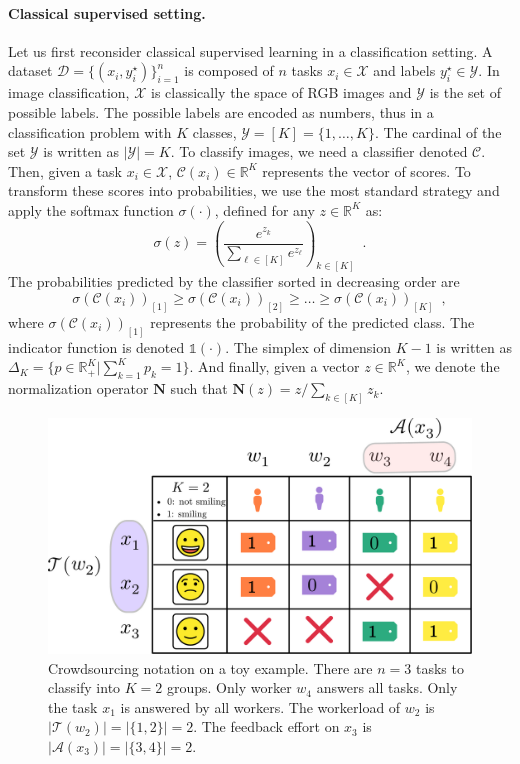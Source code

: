 \paragraph*{Classical supervised setting.}Let us first reconsider classical supervised learning in a classification setting.
A dataset $\mathcal{D}=\{(x_i, y_i^\star)\}_{i=1}^n$ is composed of $n$ tasks $x_i\in\mathcal{X}$ and labels $y_i^\star\in\mathcal{Y}$.
In image classification, $\mathcal{X}$ is classically the space of RGB images and $\mathcal{Y}$ is the set of possible labels.
The possible labels are encoded as numbers, thus in a classification problem with $K$ classes, $\mathcal{Y}=[K]=\{1,\dots,K\}$.
The cardinal of the set $\mathcal{Y}$ is written as $|\mathcal{Y}|=K$.
To classify images, we need a classifier denoted $\mathcal{C}$.
Then, given a task $x_i\in\mathcal{X}$, $\mathcal{C}(x_i)\in\mathbb{R}^K$ represents the vector of scores.
To transform these scores into probabilities, we use the most standard strategy and apply the softmax function $\sigma(\cdot)$, defined for any $z\in\mathbb{R}^K$ as:
$$
\sigma(z) = \left(\frac{e^{z_k}}{\sum_{\ell\in [K]} e^{z_\ell}}\right)_{k\in [K]} \enspace.
$$
The probabilities predicted by the classifier sorted in decreasing order are
$$
\sigma(\mathcal{C}(x_i))_{[1]} \geq \sigma(\mathcal{C}(x_i))_{[2]}\geq \dots\geq \sigma(\mathcal{C}(x_i))_{[K]} \enspace,
$$
where $\sigma(\mathcal{C}(x_i))_{[1]}$ represents the probability of the predicted class.
The indicator function is denoted $\mathds{1}(\cdot)$. The simplex of dimension $K-1$ is written as $\Delta_K=\{p \in\mathbb{R}^K_+ | \sum_{k=1}^K p_k = 1\}$.
And finally, given a vector $z\in\mathbb{R}^K$, we denote the normalization operator $\mathbf{N}$ such that $\mathbf{N}(z) = z / \sum_{k\in[K]}z_k$.

\begin{figure}[thb]
    \centering
    \includegraphics[width=.7\textwidth]{chapters/images/notations.pdf}
    \caption{Crowdsourcing notation on a toy example. There are $n=3$ tasks to classify into $K=2$ groups. Only worker $w_4$ answers all tasks. Only the task $x_1$ is answered by all workers. The workerload of $w_2$ is $|\mathcal{T}(w_2)|=|\{1,2\}|=2$. The feedback effort on $x_3$ is $|\mathcal{A}(x_3)|=|\{3,4\}|=2$.}
    \label{fig:enter-label}
\end{figure}

